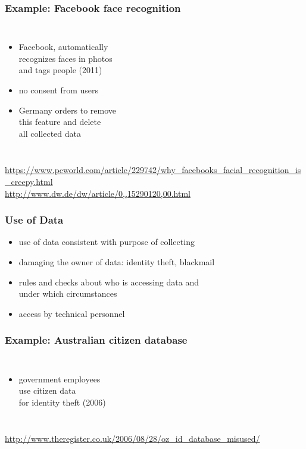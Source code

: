 \documentclass[dvipsnames]{beamer}
\theoremstyle{plain}
\begin{document}
\begin{frame}
  \frametitle{Example: Facebook face recognition}

  \begin{columns}

    \begin{itemize}
      \item Facebook, automatically\\
        recognizes faces in photos\\
        and tags people (2011)
      \item no consent from users
      \item Germany orders to remove\\
        this feature and delete\\
        all collected data
    \end{itemize}
  \end{columns}

  \medskip
  \tiny{\url{https://www.pcworld.com/article/229742/why_facebooks_facial_recognition_is_creepy.html}}\\
  \tiny{\url{http://www.dw.de/dw/article/0,,15290120,00.html}}\\
\end{frame}

\begin{frame}
  \frametitle{Use of Data}

  \begin{itemize}
    \item use of data consistent with purpose of collecting
    \item damaging the owner of data: identity theft, blackmail

    \medskip
    \item rules and checks about who is accessing data and\\
      under which circumstances
    \item access by technical personnel
  \end{itemize}
\end{frame}

\begin{frame}
  \frametitle{Example: Australian citizen database}

  \begin{columns}

    \begin{itemize}
      \item government employees\\
        use citizen data\\
        for identity theft (2006)
    \end{itemize}
  \end{columns}

  \medskip
  \tiny{\url{http://www.theregister.co.uk/2006/08/28/oz_id_database_misused/}}\\
\end{frame}
\end{document}
